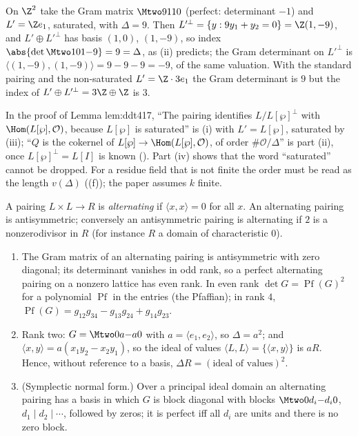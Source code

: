 \begin{example}\label{ex:modules:gram}
On $\Z^2$ take the Gram matrix $\Mtwo9110$ (perfect: determinant $-1$) and $L'=\Z e_1$, saturated, with $\Delta=9$. Then
$L'^\perp=\{y:9y_1+y_2=0\}=\Z(1,-9)$, and $L'\oplus L'^\perp$ has basis $(1,0)$, $(1,-9)$, so index $\abs{\det\Mtwo101{-9}}=9=\Delta$, as
(ii) predicts; the Gram determinant on $L'^\perp$ is $\langle(1,-9),(1,-9)\rangle=9-9-9=-9$, of the same valuation. With
the standard pairing and the non-saturated $L'=\Z\cdot3e_1$ the Gram determinant is $9$ but the index of $L'\oplus L'^\perp=3\Z\oplus\Z$ is $3$.
\end{example}

\begin{paperlink}\label{pl:modules:gram}
In the proof of Lemma lem:ddt417, ``The pairing identifies $L/L[\wp]^\perp$ with $\Hom(L[\wp],\mathcal O)$, because $L[\wp]$ is saturated'' is
(i) with $L'=L[\wp]$, saturated by (iii); ``$Q$ is the cokernel of $L[\wp]\to\Hom(L[\wp],\mathcal O)$,
of order $\#\mathcal O/\Delta$'' is part (ii), once $L[\wp]^\perp=L[I]$ is known (). Part (iv) shows that the word
``saturated'' cannot be dropped. For a residue field that is not finite the order must be read as the length $v(\Delta)$
((f)); the paper assumes $k$ finite.
\end{paperlink}

\begin{proposition}\label{prop:modules:alternating}
A pairing $L\times L\to R$ is \emph{alternating} if $\langle x,x\rangle=0$ for all $x$. An alternating pairing is antisymmetric; conversely an antisymmetric
pairing is alternating if $2$ is a nonzerodivisor in $R$ (for instance $R$ a domain of characteristic $0$).
\begin{enumerate}[label=(\roman*)]
\item The Gram matrix of an alternating pairing is antisymmetric with zero diagonal; its determinant vanishes in odd rank, so a perfect alternating
pairing on a nonzero lattice has even rank. In even rank $\det G=\operatorname{Pf}(G)^2$ for a polynomial $\operatorname{Pf}$ in the entries (the Pfaffian); in rank $4$,
$\operatorname{Pf}(G)=g_{12}g_{34}-g_{13}g_{24}+g_{14}g_{23}$.
\item Rank two: $G=\Mtwo0a{-a}0$ with $a=\langle e_1,e_2\rangle$, so $\Delta=a^2$; and $\langle x,y\rangle=a(x_1y_2-x_2y_1)$, so the ideal of values $\langle L,L\rangle=\{\langle x,y\rangle\}$ is
$aR$. Hence, without reference to a basis, $\Delta R=(\text{ideal of values})^2$.
\item (Symplectic normal form.) Over a principal ideal domain an alternating pairing has a basis in which $G$ is block diagonal with blocks
$\Mtwo0{d_i}{-d_i}0$, $d_1\mid d_2\mid\cdots$, followed by zeros; it is perfect iff all $d_i$ are units and there is no zero block.
\end{enumerate}
\end{proposition}

